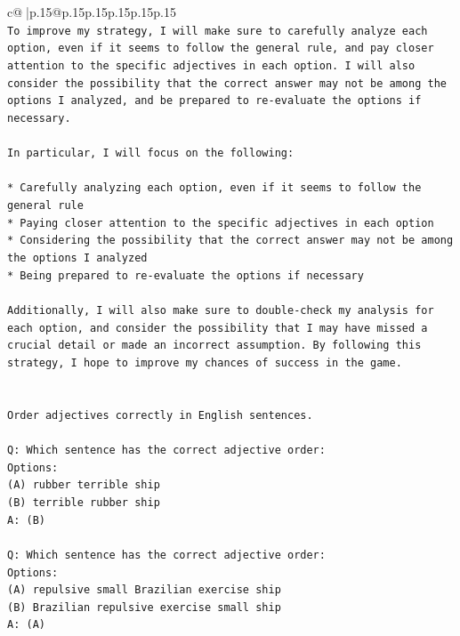 \documentclass{article}
\begin{document}
{\begin{supertabular}{c@{$\;$}|p{.15\linewidth}@{}p{.15\linewidth}p{.15\linewidth}p{.15\linewidth}p{.15\linewidth}p{.15\linewidth}}
{{{\\ 
\texttt{To improve my strategy, I will make sure to carefully analyze each option, even if it seems to follow the general rule, and pay closer attention to the specific adjectives in each option. I will also consider the possibility that the correct answer may not be among the options I analyzed, and be prepared to re{-}evaluate the options if necessary.} \\
\\ 
\texttt{In particular, I will focus on the following:} \\
\\ 
\texttt{* Carefully analyzing each option, even if it seems to follow the general rule} \\
\texttt{* Paying closer attention to the specific adjectives in each option} \\
\texttt{* Considering the possibility that the correct answer may not be among the options I analyzed} \\
\texttt{* Being prepared to re{-}evaluate the options if necessary} \\
\\ 
\texttt{Additionally, I will also make sure to double{-}check my analysis for each option, and consider the possibility that I may have missed a crucial detail or made an incorrect assumption. By following this strategy, I hope to improve my chances of success in the game.} \\
\\ 
\\ 
\texttt{Order adjectives correctly in English sentences.} \\
\\ 
\texttt{Q: Which sentence has the correct adjective order:} \\
\texttt{Options:} \\
\texttt{(A) rubber terrible ship} \\
\texttt{(B) terrible rubber ship} \\
\texttt{A: (B)} \\
\\ 
\texttt{Q: Which sentence has the correct adjective order:} \\
\texttt{Options:} \\
\texttt{(A) repulsive small Brazilian exercise ship} \\
\texttt{(B) Brazilian repulsive exercise small ship} \\
\texttt{A: (A)} \\
\\ 
}}}
\end{supertabular}}
\end{document}
